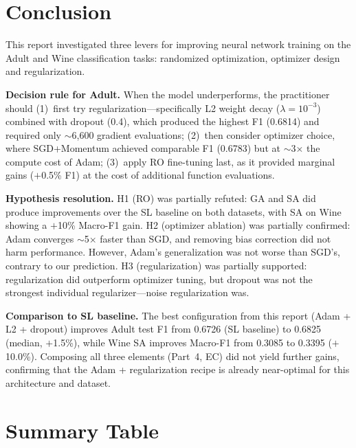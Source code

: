 \documentclass[10 pt, twocolumn]{article}
\begin{document}

\section{Conclusion}

This report investigated three levers for improving neural network training on the Adult and Wine classification tasks: randomized optimization, optimizer design and regularization.

\textbf{Decision rule for Adult.} When the model underperforms, the practitioner should (1)~first try regularization---specifically L2 weight decay ($\lambda = 10^{-3}$) combined with dropout (0.4), which produced the highest F1 (0.6814) and required only $\sim$6{,}600 gradient evaluations; (2)~then consider optimizer choice, where SGD+Momentum achieved comparable F1 (0.6783) but at $\sim$3$\times$ the compute cost of Adam; (3)~apply RO fine-tuning last, as it provided marginal gains ($+$0.5\% F1) at the cost of additional function evaluations.

\textbf{Hypothesis resolution.} H1 (RO) was partially refuted: GA and SA did produce improvements over the SL baseline on both datasets, with SA on Wine showing a $+$10\% Macro-F1 gain. H2 (optimizer ablation) was partially confirmed: Adam converges $\sim$5$\times$ faster than SGD, and removing bias correction did not harm performance. However, Adam's generalization was not worse than SGD's, contrary to our prediction. H3 (regularization) was partially supported: regularization did outperform optimizer tuning, but dropout was not the strongest individual regularizer---noise regularization was.

\textbf{Comparison to SL baseline.} The best configuration from this report (Adam + L2 + dropout) improves Adult test F1 from 0.6726 (SL baseline) to 0.6825 (median, $+$1.5\%), while Wine SA improves Macro-F1 from 0.3085 to 0.3395 ($+$10.0\%). Composing all three elements (Part~4, EC) did not yield further gains, confirming that the Adam + regularization recipe is already near-optimal for this architecture and dataset.

\section*{Summary Table}
\end{document}
